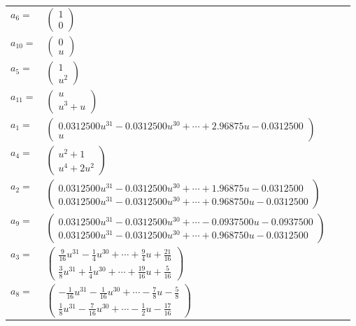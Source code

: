 \documentclass[1p]{elsarticle_modified}
\theoremstyle{definition}
\begin{document}
\begin{tabular}{m{7pt} m{180pt} m{7pt} m{180pt} }
\flushright $a_{6}=$&$\begin{pmatrix}1\\0\end{pmatrix}$ \\
\flushright $a_{10}=$&$\begin{pmatrix}0\\u\end{pmatrix}$ \\
\flushright $a_{5}=$&$\begin{pmatrix}1\\u^2\end{pmatrix}$ \\
\flushright $a_{11}=$&$\begin{pmatrix}u\\u^3+u\end{pmatrix}$ \\
\flushright $a_{1}=$&$\begin{pmatrix}0.0312500 u^{31}-0.0312500 u^{30}+\cdots+2.96875 u-0.0312500\\u\end{pmatrix}$ \\
\flushright $a_{4}=$&$\begin{pmatrix}u^2+1\\u^4+2 u^2\end{pmatrix}$ \\
\flushright $a_{2}=$&$\begin{pmatrix}0.0312500 u^{31}-0.0312500 u^{30}+\cdots+1.96875 u-0.0312500\\0.0312500 u^{31}-0.0312500 u^{30}+\cdots+0.968750 u-0.0312500\end{pmatrix}$ \\
\flushright $a_{9}=$&$\begin{pmatrix}0.0312500 u^{31}-0.0312500 u^{30}+\cdots-0.0937500 u-0.0937500\\0.0312500 u^{31}-0.0312500 u^{30}+\cdots+0.968750 u-0.0312500\end{pmatrix}$ \\
\flushright $a_{3}=$&$\begin{pmatrix}\frac{9}{16} u^{31}-\frac{1}{4} u^{30}+\cdots+\frac{9}{4} u+\frac{21}{16}\\\frac{3}{8} u^{31}+\frac{1}{4} u^{30}+\cdots+\frac{19}{16} u+\frac{5}{16}\end{pmatrix}$ \\
\flushright $a_{8}=$&$\begin{pmatrix}-\frac{1}{16} u^{31}-\frac{1}{16} u^{30}+\cdots-\frac{7}{8} u-\frac{5}{8}\\\frac{1}{8} u^{31}-\frac{7}{16} u^{30}+\cdots-\frac{1}{2} u-\frac{17}{16}\end{pmatrix}$ \\

\end{tabular}
\end{document}
